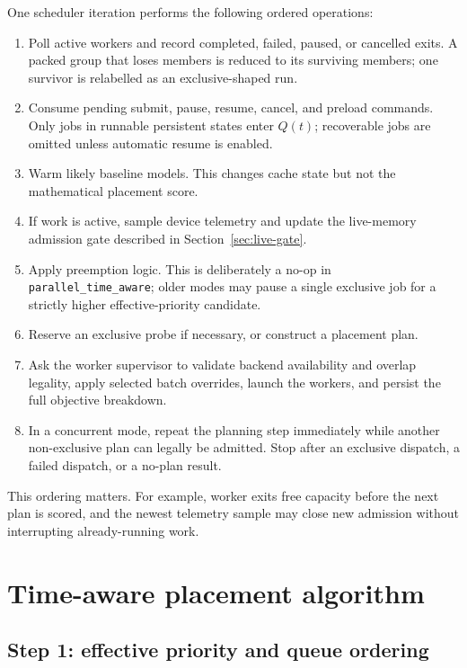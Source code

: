 \documentclass[11pt]{article}
\newcommand{\code}[1]{\textcolor{codeblue}{\texttt{#1}}}
\begin{document}
One scheduler iteration performs the following ordered operations:

\begin{enumerate}[label=\textbf{Step \arabic*:},leftmargin=*]
  \item Poll active workers and record completed, failed, paused, or cancelled
        exits.  A packed group that loses members is reduced to its surviving
        members; one survivor is relabelled as an exclusive-shaped run.
  \item Consume pending submit, pause, resume, cancel, and preload commands.
        Only jobs in runnable persistent states enter $Q(t)$; recoverable jobs
        are omitted unless automatic resume is enabled.
  \item Warm likely baseline models.  This changes cache state but not the
        mathematical placement score.
  \item If work is active, sample device telemetry and update the live-memory
        admission gate described in Section~\ref{sec:live-gate}.
  \item Apply preemption logic.  This is deliberately a no-op in
        \code{parallel\_time\_aware}; older modes may pause a single exclusive
        job for a strictly higher effective-priority candidate.
  \item Reserve an exclusive probe if necessary, or construct a placement plan.
  \item Ask the worker supervisor to validate backend availability and overlap
        legality, apply selected batch overrides, launch the workers, and persist
        the full objective breakdown.
  \item In a concurrent mode, repeat the planning step immediately while another
        non-exclusive plan can legally be admitted.  Stop after an exclusive
        dispatch, a failed dispatch, or a no-plan result.
\end{enumerate}

This ordering matters.  For example, worker exits free capacity before the next
plan is scored, and the newest telemetry sample may close new admission without
interrupting already-running work.

\section{Time-aware placement algorithm}

\subsection{Step 1: effective priority and queue ordering}
\end{document}

